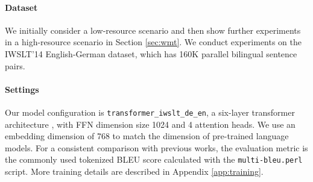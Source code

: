 \documentclass[11pt]{article}
\begin{document}
\paragraph{Dataset}
We initially consider a low-resource scenario and then show further experiments in a high-resource scenario in Section \ref{sec:wmt}. We conduct experiments on the IWSLT'14 English-German dataset, which has 160K parallel bilingual sentence pairs. 

\paragraph{Settings}
Our model configuration is \texttt{transformer\_iwslt\_de\_en}, a six-layer transformer architecture \citep{NIPS2017_3f5ee243}, with FFN dimension size 1024 and 4 attention heads. We use an embedding dimension of 768 to match the dimension of pre-trained language models. For a consistent comparison with previous works, the evaluation metric is the commonly used tokenized BLEU \citep{papineni2002bleu} score calculated with the \texttt{multi-bleu.perl} script. More training details are described in Appendix \ref{app:training}.
\end{document}
